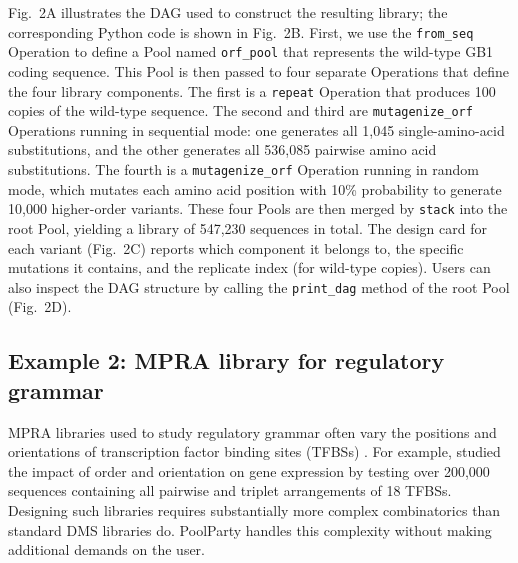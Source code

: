 Fig.~2A illustrates the DAG used to construct the resulting library; the corresponding Python code is shown in Fig.~2B. First, we use the \texttt{from\_seq} Operation to define a Pool named \texttt{orf\_pool} that represents the wild-type GB1 coding sequence. This Pool is then passed to four separate Operations that define the four library components. The first is a \texttt{repeat} Operation that produces 100 copies of the wild-type sequence. The second and third are \texttt{mutagenize\_orf} Operations running in sequential mode: one generates all 1,045 single-amino-acid substitutions, and the other generates all 536,085 pairwise amino acid substitutions. The fourth is a \texttt{mutagenize\_orf} Operation running in random mode, which mutates each amino acid position with 10\% probability to generate 10,000 higher-order variants.  These four Pools are then merged by \texttt{stack} into the root Pool, yielding a library of 547,230 sequences in total. The design card for each variant (Fig.~2C) reports which component it belongs to, the specific mutations it contains, and the replicate index (for wild-type copies). Users can also inspect the DAG structure by calling the \texttt{print\_dag} method of the root Pool (Fig.~2D).

\subsection*{Example 2: MPRA library for regulatory grammar}\label{subsec:example2-mpra}

MPRA libraries used to study regulatory grammar often vary the positions and orientations of transcription factor binding sites (TFBSs) \citep{Melnikov2012dw, Sharon2012io, King2020aa, Smith2013kn, Grossman2017aa, WeingartenGabbay2019bl, GeorgakopoulosSoares2023tf}. For example, \citet{GeorgakopoulosSoares2023tf} studied the impact of order and orientation on gene expression by testing over 200,000 sequences containing all pairwise and triplet arrangements of 18 TFBSs. Designing such libraries requires substantially more complex combinatorics than standard DMS libraries do. PoolParty handles this complexity without making additional demands on the user.

